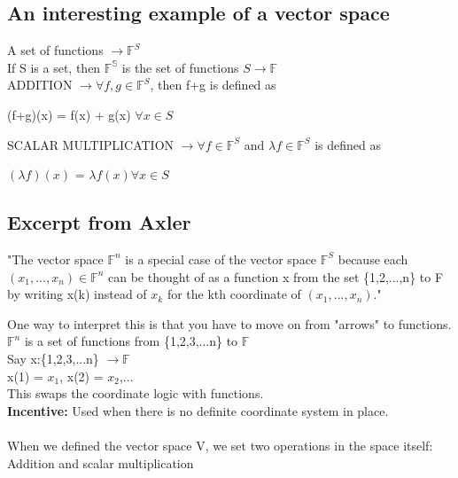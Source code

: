 \documentclass{article}
\begin{document}
\subsection{An interesting example of a vector space}
A set of functions $\rightarrow \mathbb{F}^S$ \\
If S is a set, then $\mathbb{F^S}$ is the set of functions $S \rightarrow \mathbb{F}$ \\
ADDITION $\rightarrow \forall f,g\in \mathbb{F}^S$, then f+g is defined as 
\begin{center}
    (f+g)(x) = f(x) + g(x) $\forall x \in S$
\end{center}
SCALAR MULTIPLICATION $\rightarrow \forall f\in \mathbb{F}^S$ and $\lambda f \in \mathbb{F}^S$ is defined as 
\begin{center}
    $(\lambda f)(x)$ = $\lambda f(x) \forall x\in S$
\end{center}
\subsection{Excerpt from Axler}
\begin{center}
    "The vector space $\mathbb{F}^n$ is a special case of the vector space $\mathbb{F}^S$ because each $(x_1, ..., x_n) \in \mathbb{F}^n$ can be thought of as a function x from the set \{1,2,...,n\} to F by writing x(k) instead of $x_k$ for the kth coordinate of $(x_1, ..., x_n)$."
\end{center}
One way to interpret this is that you have to move on from "arrows" to functions. \\
$\mathbb{F}^n$ is a set of functions from \{1,2,3,...n\} to $\mathbb{F}$ \\
Say x:\{1,2,3,...n\} $\rightarrow \mathbb{F}$ \\
x(1) = $x_1$, x(2) = $x_2$,... \\ 
This swaps the coordinate logic with functions. \\
\textbf{Incentive:} Used when there is no definite coordinate system in place. \\ 
\\
When we defined the vector space V, we set two operations in the space itself: Addition and scalar multiplication \\
\end{document}
